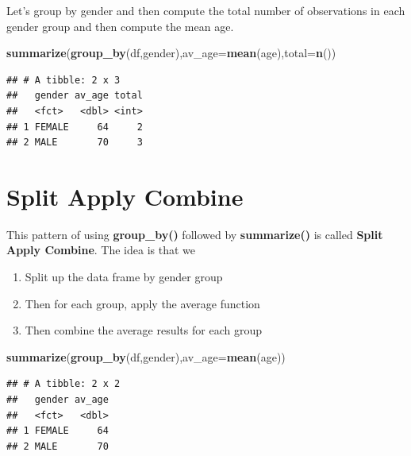 \documentclass[]{book}
\newenvironment{Shaded}{\begin{snugshade}}{\end{snugshade}}
\newcommand{\DataTypeTok}[1]{\textcolor[rgb]{0.13,0.29,0.53}{#1}}
\newcommand{\KeywordTok}[1]{\textcolor[rgb]{0.13,0.29,0.53}{\textbf{#1}}}
\newcommand{\NormalTok}[1]{#1}
\providecommand{\tightlist}{%
  \setlength{\itemsep}{0pt}\setlength{\parskip}{0pt}}
\begin{document}
Let's group by gender and then compute the total number of observations in each gender group and then compute the mean age.

\begin{Shaded}
\begin{Highlighting}[]
\KeywordTok{summarize}\NormalTok{(}\KeywordTok{group_by}\NormalTok{(df,gender),}\DataTypeTok{av_age=}\KeywordTok{mean}\NormalTok{(age),}\DataTypeTok{total=}\KeywordTok{n}\NormalTok{())}
\end{Highlighting}
\end{Shaded}

\begin{verbatim}
## # A tibble: 2 x 3
##   gender av_age total
##   <fct>   <dbl> <int>
## 1 FEMALE     64     2
## 2 MALE       70     3
\end{verbatim}

\hypertarget{split-apply-combine}{%
\chapter{Split Apply Combine}\label{split-apply-combine}}

This pattern of using \textbf{group\_by()} followed by \textbf{summarize()}
is called \textbf{Split Apply Combine}. The idea is that we

\begin{enumerate}
\def\labelenumi{\arabic{enumi})}
\tightlist
\item
  Split up the data frame by gender group
\item
  Then for each group, apply the average function
\item
  Then combine the average results for each group
\end{enumerate}

\begin{Shaded}
\begin{Highlighting}[]
\KeywordTok{summarize}\NormalTok{(}\KeywordTok{group_by}\NormalTok{(df,gender),}\DataTypeTok{av_age=}\KeywordTok{mean}\NormalTok{(age))}
\end{Highlighting}
\end{Shaded}

\begin{verbatim}
## # A tibble: 2 x 2
##   gender av_age
##   <fct>   <dbl>
## 1 FEMALE     64
## 2 MALE       70
\end{verbatim}
\end{document}
